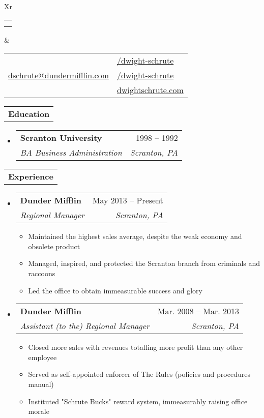 \documentclass[letterpaper,12pt]{article}[leftmargin=*]
\makeatletter
\def \fullname {Dwight Schrute}
\def \subtitle {}
\def \linkedinicon {\faLinkedin}
\def \linkedinlink {https://linkedin.com/in/dwight-schrute/}
\def \linkedintext {/dwight-schrute}
\def \phoneicon {\faPhone}
\def \phonetext {+1-123-456-7890}
\def \emailicon {\faEnvelope}
\def \emaillink {mailto:dschrute@dundermifflin.com}
\def \emailtext {dschrute@dundermifflin.com}
\def \githubicon {\faGithub}
\def \githublink {https://github.com/dwight-schrute}
\def \githubtext {/dwight-schrute}
\def \websiteicon {\faGlobe}
\def \websitelink {https://google.com/}
\def \websitetext {dwightschrute.com}
\def \addressicon {\faMapMarker}
\def \addresstext {Vancouver, BC, Canada}
\def \headertype {\doublecol} %
\def \entryspacing {0pt}
\def \linkedin {\linkedinicon \hspace{3pt}\href{\linkedinlink}{\linkedintext}}
\def \phone {\phoneicon \hspace{3pt}{ \phonetext}}
\def \email {\emailicon \hspace{3pt}\href{\emaillink}{\emailtext}}
\def \github {\githubicon \hspace{3pt}\href{\githublink}{\githubtext}}
\def \website {\websiteicon \hspace{3pt}\href{\websitelink}{\websitetext}}
\def \address {\addressicon \hspace{3pt}{ \addresstext}}
\renewcommand{\section}[1]{
  \begin{tabularx}{\textwidth} {X}
    \rowcolor{secondary}
    \hspace{5pt}\color{white}\textbf{#1}\\
  \end{tabularx}
  \vspace{-10pt}
}
\newcommand{\resumeEntryStart}{\begin{itemize}[leftmargin=2.5mm]}
\newcommand{\resumeEntryEnd}{\end{itemize}\vspace{\entryspacing}}
\newcommand{\resumeItemListStart}{\begin{itemize}[leftmargin=4.5mm]}
\newcommand{\resumeItemListEnd}{\end{itemize}}
\newcommand{\resumeItem}[1]{
  \item{
    {#1 \vspace{-2pt}}
  }
}
\newcommand{\resumeEntryTSDL}[4]{
  \vspace{-1pt}\item[]
  \begin{tabularx}{0.97\textwidth}{X@{\hspace{60pt}}r}
    \textbf{\color{primary}#1} & {\firabook\color{accent}\small#2} \\
    \textit{\color{accent}\small#3} & \textit{\color{accent}\small#4} \\
  \end{tabularx}\vspace{-6pt}
}
\newcommand{\doublecol}[6]{
  \begin{tabularx}{\textwidth}{Xr}
    {
      \begin{tabular}[c]{l}
        \fontsize{35}{45}\selectfont{\color{primary}{{\textbf{\fullname}}}} \\
                 {\textit{\subtitle}} %
      \end{tabular}
    } & {
      \begin{tabular}[c]{l@{\hspace{1.5em}}l}
        {\small#4} & {\small#1} \\
        {\small#5} & {\small#2} \\
        {\small#6} & {\small#3}
      \end{tabular}
    }
  \end{tabularx}
}
\newcommand{\singlecol}[6]{
  \begin{tabularx}{\textwidth}{Xr}
    {
      \begin{tabular}[b]{l}
        \fontsize{35}{45}\selectfont{\color{primary}{{\textbf{\fullname}}}} \\
                 {\textit{\subtitle}} %
      \end{tabular}
    } & {
      \begin{tabular}[c]{l}
        {\small#1} \\
        {\small#2} \\
        {\small#3} \\
        {\small#4} \\
        {\small#5} \\
        {\small#6}
      \end{tabular}
    }
  \end{tabularx}
}
\makeatother
\begin{document}


\headertype{\linkedin}{\github}{\website}{\phone}{\email}{\address} %
\vspace{-10pt} %

\section{Education}

  \resumeEntryStart
    \resumeEntryTSDL
      {Scranton University}{1998 -- 1992}
      {BA Business Administration}{Scranton, PA}
  \resumeEntryEnd

\section{Experience}

  \resumeEntryStart
    \resumeEntryTSDL
      {Dunder Mifflin}{May 2013 -- Present}
      {Regional Manager}{Scranton, PA}
    \resumeItemListStart
      \resumeItem {Maintained the highest sales average, despite the weak economy and obsolete product}
      \resumeItem {Managed, inspired, and protected the Scranton branch from criminals and raccoons}
      \resumeItem {Led the office to obtain immeasurable success and glory}
    \resumeItemListEnd
  \resumeEntryEnd

  \resumeEntryStart
    \resumeEntryTSDL
      {Dunder Mifflin}{Mar. 2008 -- Mar. 2013}
      {Assistant (to the) Regional Manager}{Scranton, PA}
    \resumeItemListStart
      \resumeItem {Closed more sales with revenues totalling more profit than any other employee}
      \resumeItem {Served as self-appointed enforcer of The Rules (policies and procedures manual)}
      \resumeItem {Instituted "Schrute Bucks" reward system, immeasurably raising office morale}
    \resumeItemListEnd
  \resumeEntryEnd
\end{document}
